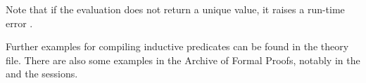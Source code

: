 \begin{isabellebody}
\begin{isamarkuptext}
\begin{itemize}
\begin{quote}
\end{quote}
  Note that if the evaluation does not return a unique value, it raises a run-time error
  .
\end{itemize}%
\end{isamarkuptext}%
\isamarkuptrue%
%
\isamarkuptrue%
%
\begin{isamarkuptext}%
Further examples for compiling inductive predicates can be found in
the  theory file.
There are also some examples in the Archive of Formal Proofs, notably
in the  and the  sessions.%
\end{isamarkuptext}%
\isamarkuptrue%
%
\isadelimtheory
%
\endisadelimtheory
%
\isatagtheory
{}\isamarkupfalse%
%
\endisatagtheory
{\isafoldtheory}%
%
\isadelimtheory
%
\endisadelimtheory
\isanewline
\end{isabellebody}%
